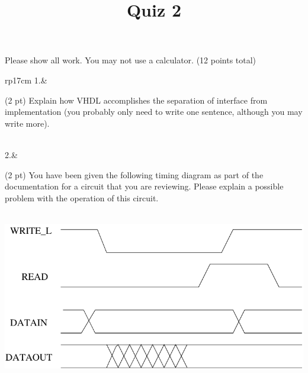 \documentclass{article}
\title{Quiz 2}
\date{}
\begin{document}
\maketitle
Please show all work.  You may not use a calculator. (12 points total)
\begin{longtable}[l]{rp{17cm}}
1.&\begin{minipage}[t]{\linewidth}(2 pt) Explain how VHDL accomplishes the separation of interface from implementation (you probably only need to write one sentence, although you may write more).\\

\vspace{4cm
}
\end{minipage}\\
\medskip
2.&\begin{minipage}[t]{\linewidth}(2 pt) You have been given the following timing diagram as part of the documentation for a circuit that you are reviewing.  Please explain a possible problem with the operation of this circuit.\\ \\
\begin{center}
  \includegraphics{../CombinationalDesign/Assessments/TimingDiagramReadWrite}
\end{center}


\end{minipage}
\end{longtable}
\end{document}
